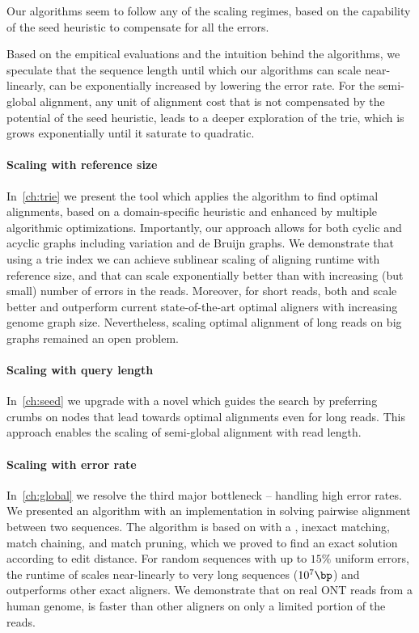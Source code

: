 Our algorithms seem to follow any of the scaling regimes, based on the
capability of the seed heuristic to compensate for all the errors.

Based on the empitical evaluations and the intuition behind the algorithms, we
speculate that the sequence length until which our algorithms can scale
near-linearly, can be exponentially increased by lowering the error rate. For
the semi-global alignment, any unit of alignment cost that is not compensated by
the potential of the seed heuristic, leads to a deeper exploration of the trie,
which is grows exponentially until it saturate to quadratic.

\paragraph{Scaling with reference size}
In~\cref{ch:trie} we present the tool \astarix which applies the \A algorithm to
find optimal alignments, based on a domain-specific heuristic and enhanced by
multiple algorithmic optimizations. Importantly, our approach allows for both
cyclic and acyclic graphs including variation and de Bruijn graphs. We
demonstrate that using a trie index we can achieve sublinear scaling of aligning
runtime with reference size, and that \A can scale exponentially better than
\dijkstra with increasing (but small) number of errors in the reads. Moreover,
for short reads, both \astarix and \dijkstra scale better and outperform current
state-of-the-art optimal aligners with increasing genome graph size.
Nevertheless, scaling optimal alignment of long reads on big graphs remained an
open problem.

\paragraph{Scaling with query length}
In~\cref{ch:seed} we upgrade \astarix with a novel \sh which guides the \A
search by preferring crumbs on nodes that lead towards optimal alignments even
for long reads. This approach enables the scaling of semi-global alignment with
read length.

\paragraph{Scaling with error rate}
In~\cref{ch:global} we resolve the third major bottleneck -- handling high error
rates. We presented an algorithm with an implementation in \astarpa solving
pairwise alignment between two sequences. The algorithm is based on \A with a
\sh, inexact matching, match chaining, and match pruning, which we proved to
find an exact solution according to edit distance. For random sequences with up
to $15\%$ uniform errors, the runtime of \astarpa scales near-linearly to very
long sequences ($10^7\bp$) and outperforms other exact aligners. We demonstrate
that on real ONT reads from a human genome, \astarpa is faster than other
aligners on only a limited portion of the reads.
